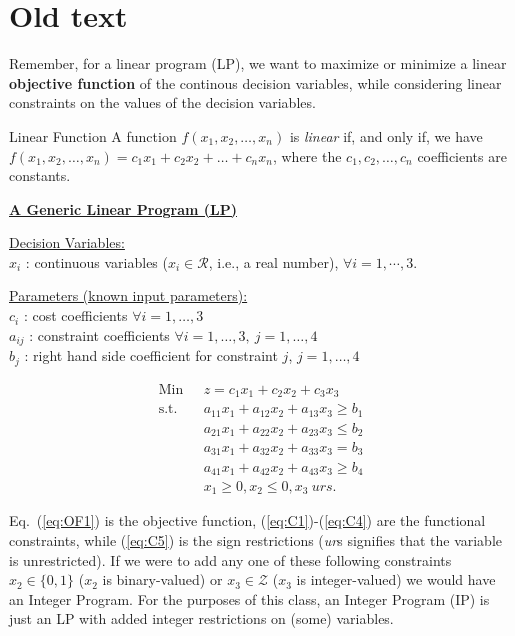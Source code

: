 \chapter{Old text}
Remember, for a linear program (LP), we want to maximize or minimize a linear {\bf objective function} of the continous decision variables, while considering linear constraints on the values of the decision variables.

\begin{definition}{Linear Function}
A function $f(x_1,x_2,\dots,x_n)$ is \emph{linear} if, and only if, we have $f(x_1,x_2,\dots,x_n) = c_1x_1 + c_2x_2 + \dots + c_nx_n$, where the  $c_1,c_2,\dots,c_n$ coefficients are constants.  
\end{definition}

\bigskip  \underline{\bf A Generic Linear Program (LP)}

\medskip  \underline{Decision Variables:}\\
$x_i$ : continuous variables ($x_i \in \mathcal{R}$, i.e., a real number), $\forall i = 1,\cdots,3$.

\medskip \underline{Parameters (known input parameters):}\\
$c_i$ : cost coefficients $\forall i = 1,\dots,3$ \\
$a_{ij}$ : constraint coefficients $\forall i = 1,\dots,3,~ j = 1,\dots,4$ \\
$b_j$ : right hand side coefficient for constraint $j$, $j = 1,\dots,4$

\begin{align}
\mbox{Min~~} & z = c_1x_1 + c_2x_2 + c_3x_3  \label{eq:OF1}\\
\mbox{s.t.~~} & a_{11}x_1 + a_{12}x_2 + a_{13} x_3 \ge b_1 \label{eq:C1} \\
& a_{21}x_1 + a_{22}x_2 + a_{23} x_3 \le b_2 \label{eq:C2} \\
& a_{31}x_1 + a_{32}x_2 + a_{33} x_3 = b_3 \label{eq:C3}\\
& a_{41}x_1 + a_{42}x_2 + a_{43} x_3 \ge b_4 \label{eq:C4}\\
& x_1 \ge 0, x_2 \le 0, x_3~urs \label{eq:C5}.
\end{align}

Eq.~(\ref{eq:OF1}) is the objective function, (\ref{eq:C1})-(\ref{eq:C4}) are the functional constraints, while (\ref{eq:C5}) is the sign restrictions ({\it ur}s signifies that the variable is unrestricted). If we were to add any one of these following constraints $x_2 \in \{0, 1\}$ ($x_2$ is binary-valued) or $x_3 \in \mathcal{Z}$ ($x_3$ is integer-valued) we would have an Integer Program.  For the purposes of this class, an Integer Program (IP) is just an LP with added integer restrictions on (some) variables.


